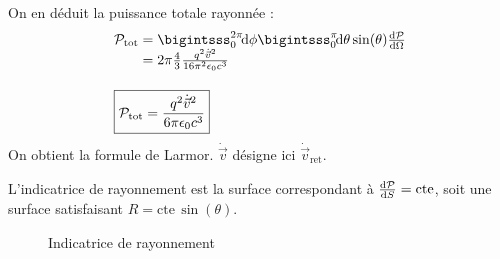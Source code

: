 On en déduit la puissance totale rayonnée :
$$
	\begin{array}{r@{\;}l}
		\mathcal{P}_\text{tot}&=\bigintsss_0^{2\pi}\!\dif\phi\bigintsss_0^\pi\!\dif\theta\sin(\theta)\frac{\dif\mathcal{P}}{\dif\Omega}\\
			&=2\pi\frac{4}{3}\frac{q^2\dot{\vec{v}}^2}{16\pi^2\epsilon_0c^3}\\[15pt]
			\multicolumn{2}{l}{\boxed{\mathcal{P_\text{tot}}=\frac{q^2\dot{\vec{v}}^2}{6\pi\epsilon_0c^3}}}
	\end{array}
$$
On obtient la formule de Larmor. $\dot{\vec{v}}$ désigne ici $\dot{\vec{v}}_\text{ret}$.

L'indicatrice de rayonnement est la surface correspondant à $\frac{\mathrm{d}\mathcal{P}}{\mathrm{d} S}=\text{cte}$, soit une surface satisfaisant $R=\text{cte}\,\sin(\theta)$.

\begin{figure}[H]
\centering
{}
\caption*{Indicatrice de rayonnement}
\end{figure}